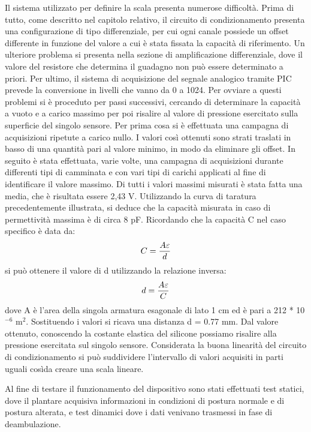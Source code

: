 \documentclass[12pt,a4paper,oneside,openright,italian]{article}
\begin{document}
Il sistema utilizzato per definire la scala presenta numerose difficolt\`a. Prima di tutto, come descritto nel capitolo relativo, il circuito di condizionamento presenta una configurazione di tipo differenziale, per cui ogni canale possiede un offset differente in funzione del valore a cui \`e stata fissata la capacit\`a di riferimento. Un ulteriore problema si presenta nella sezione di amplificazione differenziale, dove il valore del resistore che determina il guadagno non pu\`o essere determinato a priori. Per ultimo, il sistema di acquisizione del segnale analogico tramite PIC prevede la conversione in livelli che vanno da 0 a 1024. Per ovviare a questi problemi si \`e proceduto per passi successivi, cercando di determinare la capacit\`a a vuoto e a carico massimo per poi risalire al valore di pressione esercitato sulla superficie del singolo sensore. Per prima cosa si \`e effettuata una campagna di acquisizioni ripetute a carico nullo. I valori cos\`i ottenuti sono strati traslati in basso di una quantit\`a pari al valore minimo, in modo da eliminare gli offset. In seguito \`e stata effettuata, varie volte, una campagna di acquisizioni durante differenti tipi di camminata e con vari tipi di carichi applicati al fine di identificare il valore massimo. Di tutti i valori massimi misurati \`e stata fatta una media, che \`e risultata essere 2,43 V. Utilizzando la curva di taratura precedentemente illustrata, si deduce che la capacit\`a misurata in caso di permettivit\`a massima \`e di circa 8 pF. Ricordando che la capacit\`a C nel caso specifico \`e data da:
\begin{equation}
C = {A \varepsilon \over d}
\end{equation}
si pu\`o ottenere il valore di d utilizzando la relazione inversa:
\begin{equation}
d = {A \varepsilon \over C}
\end{equation}
dove A \`e l'area della singola armatura esagonale di lato 1 cm ed \`e pari a 212 * 10$^{-6}$ m$^2$. Sostituendo i valori si ricava una distanza d = 0.77 mm. Dal valore ottenuto, conoscendo la costante elastica del silicone possiamo risalire alla pressione esercitata sul singolo sensore. Considerata la buona linearit\`a del circuito di condizionamento si pu\`o suddividere l'intervallo di valori acquisiti in parti uguali cos\`ida creare una scala lineare.

Al fine di testare il funzionamento del dispositivo sono stati effettuati test statici, dove il plantare acquisiva informazioni in condizioni di postura normale e di postura alterata, e test dinamici dove i dati venivano trasmessi in fase di deambulazione.
\end{document}
